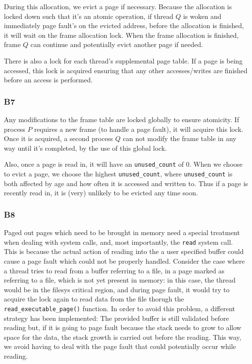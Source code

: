 \documentclass[a4wide, 11pt]{article}
\newcommand{\tx}{\texttt}
\begin{document}
During this allocation, we evict a page if necessary. Because the allocation is locked down such that it's an atomic operation, if thread $Q$ is woken and immediately page fault's on the evicted address, before the allocation is finished, it will wait on the frame allocation lock. When the frame allocation is finished, frame $Q$ can continue and potentially evict another page if needed.

There is also a lock for each thread's supplemental page table. If a page is being accessed, this lock is acquired ensuring that any other accesses/writes are finished before an access is performed.

\subsubsection{B7}

Any modifications to the frame table are locked globally to ensure atomicity. If process $P$ requires a new frame (to handle a page fault), it will acquire this lock. Once it is acquired, a second process $Q$ can not modify the frame table in any way until it's completed, by the use of this global lock.

Also, once a page is read in, it will have an \tx{unused\_count} of 0. When we choose to evict a page, we choose the highest \tx{unused\_count}, where \tx{unused\_count} is both affected by age and how often it is accessed and written to. Thus if a page is recently read in, it is (very) unlikely to be evicted any time soon.

\subsubsection{B8}
Paged out pages which need to be brought in memory need a special treatment when dealing with system calls, and, most importantly, the \tx{read} system call. This is because the actual action of reading into the a user specified buffer could cause a page fault which could not be properly handled. Consider the case where a thread tries to read from a buffer referring to a file, in a page marked as referring to a file, which is not yet present in memory: in this case, the thread would be in the filesys critical region, and during page fault, it would try to acquire the lock again to read data from the file thorugh the \tx{read\_executable\_page()} function. In order to avoid this problem, a different strategy has been implemented: The provided buffer is still validated before reading but, if it is going to page fault because the stack needs to grow to allow space for the data, the stack growth is carried out before the reading. This way, we avoid having to deal with the page fault that could potentially occur while reading.  
\end{document}
